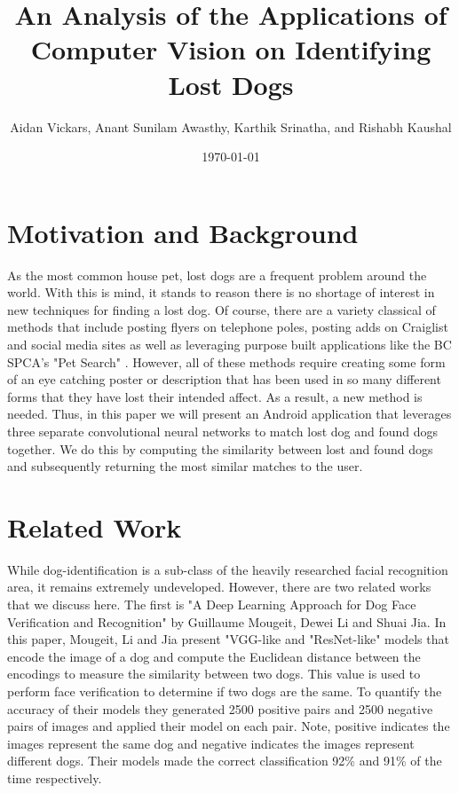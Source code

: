 \documentclass{article}
\title{An Analysis of the Applications of Computer Vision on Identifying Lost Dogs}
\author{Aidan Vickars, Anant Sunilam Awasthy, Karthik Srinatha, and Rishabh Kaushal}
\date{\today}
\begin{document}
\maketitle

\newpage

\tableofcontents

\newpage
\section{Motivation and Background}
As the most common house pet, lost dogs are a frequent problem around the world.  With this is mind, it stands to reason there is no shortage of interest in new techniques for finding a lost dog.  Of course, there are a variety classical of methods that include posting flyers on telephone poles, posting adds on Craiglist and social media sites as well as leveraging purpose built applications like the BC SPCA's "Pet Search" \cite{bcspcapetsearch}.  However, all of these methods require creating some form of an eye catching poster or description that has been used in so many different forms that they have lost their intended affect.  As a result, a new method is needed.  Thus, in this paper we will present an Android application that leverages three separate convolutional neural networks to match lost dog and found dogs together.  We do this by computing the similarity between lost and found dogs and subsequently returning the most similar matches to the user.

\section{Related Work}
	While dog-identification is a sub-class of the heavily researched facial recognition area, it remains extremely undeveloped.  However, there are two related works that we discuss here.  The first is "A Deep Learning Approach for Dog Face Verification and Recognition" \cite{MougeotGuillaume2019ADLA}  by  Guillaume Mougeit, Dewei Li and Shuai Jia.  In this paper, Mougeit, Li and Jia present "VGG-like and "ResNet-like" models that encode the image of a dog and compute the Euclidean distance between the encodings to measure the similarity between two dogs.  This value is used to perform face verification to determine if two dogs are the same.  To quantify the accuracy of their models they generated 2500 positive pairs and 2500 negative pairs of images and applied their model on each pair.  Note, positive indicates the images represent the same dog and negative indicates the images represent different dogs.  Their models made the correct classification 92\% and 91\% of the time respectively.
\end{document}
